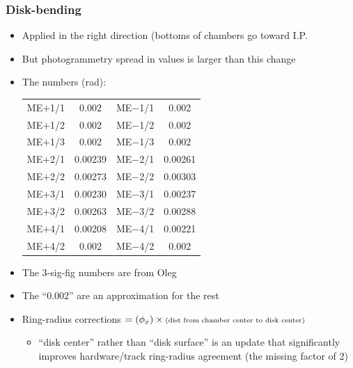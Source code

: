 \documentclass[compress]{beamer}
\begin{document}
\begin{frame}
\frametitle{Disk-bending}
\begin{itemize}
\item Applied in the right direction (bottoms of chambers go toward I.P.
\item But photogrammetry spread in values is larger than this change

\item The numbers (rad):
\begin{tabular}{c c | c c}
ME$+$1/1 & 0.002 & ME$-$1/1 & 0.002 \\
ME$+$1/2 & 0.002 & ME$-$1/2 & 0.002 \\
ME$+$1/3 & 0.002 & ME$-$1/3 & 0.002 \\
ME$+$2/1 & 0.00239 & ME$-$2/1 & 0.00261 \\
ME$+$2/2 & 0.00273 & ME$-$2/2 & 0.00303 \\
ME$+$3/1 & 0.00230 & ME$-$3/1 & 0.00237 \\
ME$+$3/2 & 0.00263 & ME$-$3/2 & 0.00288 \\
ME$+$4/1 & 0.00208 & ME$-$4/1 & 0.00221 \\
ME$+$4/2 & 0.002 & ME$-$4/2 & 0.002 \\
\end{tabular}

\item The 3-sig-fig numbers are from Oleg
\item The ``0.002'' are an approximation for the rest
\item Ring-radius corrections $= (\phi_x) \times \mbox{\scriptsize (dist from chamber center to disk center)\hspace{-1 cm}}$
\begin{itemize}
\item ``disk center'' rather than ``disk surface'' is an update that
  significantly improves hardware/track ring-radius agreement (the
  missing factor of 2)
\end{itemize}
\end{itemize}
\end{frame}
\end{document}
